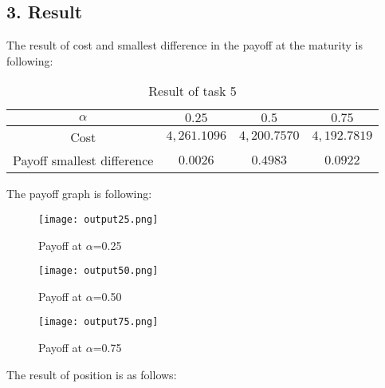 \subsection*{3. Result}
The result of cost and smallest difference in the payoff at the maturity is following:
\begin{table}[H]
    \centering
    \begin{tabular}{|c|c|c|c|}
        \hline
        $\alpha$& $0.25$ & $0.5$ & $0.75$ \\
        \hline
        Cost & $4,261.1096$& $4,200.7570$& $4,192.7819$\\
        \hline
        Payoff smallest difference & $0.0026$&$0.4983$ & $0.0922$\\
        \hline
    \end{tabular}
    \caption{Result of task 5}
    \label{tab:task_5_result}
\end{table}
The payoff graph is following:
\begin{figure}[H]
    \centering
    \texttt{[image: output25.png]}
    \caption{Payoff at $\alpha$=0.25}
    \label{tab:Payoff at 0.25}
\end{figure}
\begin{figure}[H]
    \centering
    \texttt{[image: output50.png]}
    \caption{Payoff at $\alpha$=0.50}
    \label{tab:Payoff at 0.50}
\end{figure}
\begin{figure}[H]
    \centering
    \texttt{[image: output75.png]}
    \caption{Payoff at $\alpha$=0.75}
    \label{tab:Payoff at 0.75}
\end{figure}
The result of position is as follows:
